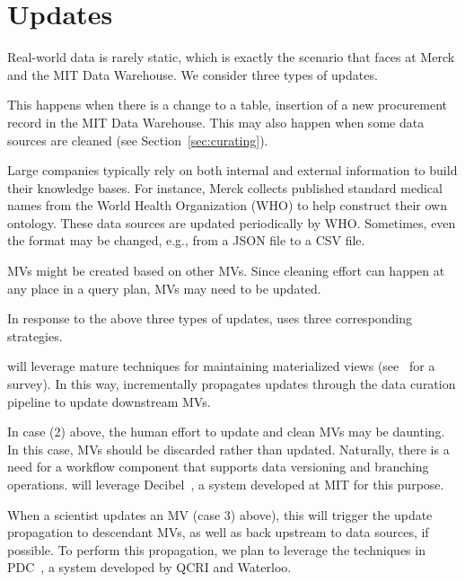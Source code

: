 \section{Updates}
\label{sec:updates}

Real-world data is rarely static, which is exactly the scenario that \dcv faces at Merck and the MIT Data Warehouse.  We consider three types of updates.

 This happens when there is a change to a table, \eg insertion of a new procurement record in the MIT Data Warehouse. This may also happen when some data sources are cleaned (see Section~\ref{sec:curating}).


 Large companies typically rely on both internal and external information to build their knowledge bases. For instance, Merck collects published standard medical names from the World Health Organization (WHO) to help construct their own ontology. These data sources are updated periodically by WHO.  Sometimes, even the format may be changed, e.g., from a JSON file to a CSV file.


 MVs might be created based on other MVs.  Since cleaning effort can happen at any place in a query plan, MVs may need to be updated.


In response to the above three types of updates, \dcv uses three corresponding strategies.


 \dcv will leverage mature techniques for maintaining materialized views (see~\cite{DBLP:journals/debu/GuptaM95} for a survey).  In this way, \dcv incrementally propagates updates through the data curation pipeline to update downstream MVs.




  In case (2) above, the human effort to update and clean MVs may be daunting. In this case, MVs should be discarded rather than updated. Naturally, there is a need for a workflow component that supports data versioning and branching operations. \dcv will leverage Decibel~\cite{DBLP:journals/pvldb/MaddoxGEMPD16}, a system developed at MIT for this purpose.

 When a scientist updates an MV (case 3) above), this will trigger the update propagation to descendant MVs, as well as back upstream to data sources, if possible. To perform this propagation, we plan to leverage the techniques in PDC~\cite{DBLP:conf/sigmod/ChalamallaIOP14}, a system developed by QCRI and Waterloo.



